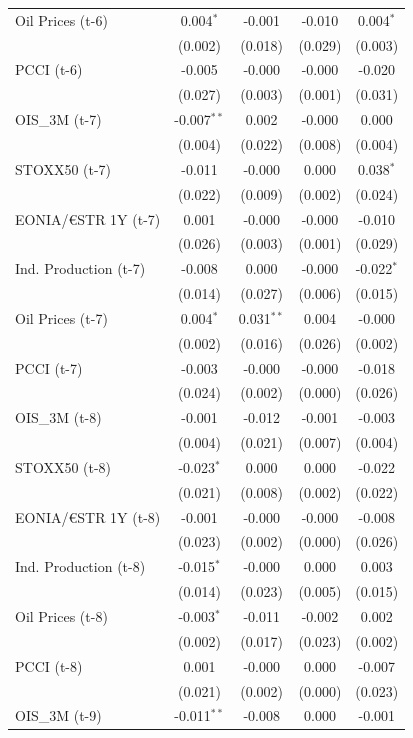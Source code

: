 \begin{longtable}[t]{lcccc}
Oil Prices (t-6) & 0.004$^{*}$ & -0.001 & -0.010 & 0.004$^{*}$\\
 & (0.002) & (0.018) & (0.029) & (0.003)\\
PCCI (t-6) & -0.005 & -0.000 & -0.000 & -0.020\\
 & (0.027) & (0.003) & (0.001) & (0.031)\\
OIS\_3M (t-7) & -0.007$^{**}$ & 0.002 & -0.000 & 0.000\\
 & (0.004) & (0.022) & (0.008) & (0.004)\\
STOXX50 (t-7) & -0.011 & -0.000 & 0.000 & 0.038$^{*}$\\
 & (0.022) & (0.009) & (0.002) & (0.024)\\
EONIA/€STR 1Y (t-7) & 0.001 & -0.000 & -0.000 & -0.010\\
 & (0.026) & (0.003) & (0.001) & (0.029)\\
Ind. Production (t-7) & -0.008 & 0.000 & -0.000 & -0.022$^{*}$\\
 & (0.014) & (0.027) & (0.006) & (0.015)\\
Oil Prices (t-7) & 0.004$^{*}$ & 0.031$^{**}$ & 0.004 & -0.000\\
 & (0.002) & (0.016) & (0.026) & (0.002)\\
PCCI (t-7) & -0.003 & -0.000 & -0.000 & -0.018\\
 & (0.024) & (0.002) & (0.000) & (0.026)\\
OIS\_3M (t-8) & -0.001 & -0.012 & -0.001 & -0.003\\
 & (0.004) & (0.021) & (0.007) & (0.004)\\
STOXX50 (t-8) & -0.023$^{*}$ & 0.000 & 0.000 & -0.022\\
 & (0.021) & (0.008) & (0.002) & (0.022)\\
EONIA/€STR 1Y (t-8) & -0.001 & -0.000 & -0.000 & -0.008\\
 & (0.023) & (0.002) & (0.000) & (0.026)\\
Ind. Production (t-8) & -0.015$^{*}$ & -0.000 & 0.000 & 0.003\\
 & (0.014) & (0.023) & (0.005) & (0.015)\\
Oil Prices (t-8) & -0.003$^{*}$ & -0.011 & -0.002 & 0.002\\
 & (0.002) & (0.017) & (0.023) & (0.002)\\
PCCI (t-8) & 0.001 & -0.000 & 0.000 & -0.007\\
 & (0.021) & (0.002) & (0.000) & \vphantom{1} (0.023)\\
OIS\_3M (t-9) & -0.011$^{**}$ & -0.008 & 0.000 & -0.001\\

\end{longtable}
